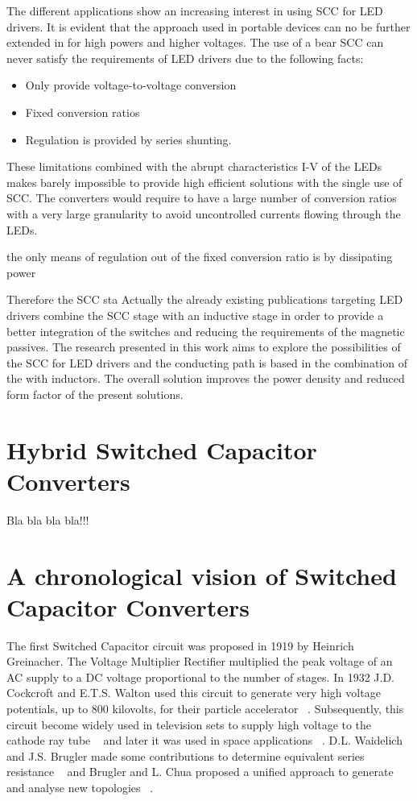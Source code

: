 The different applications show an increasing interest in using SCC for LED drivers. It is evident that the approach used in portable devices can no be further extended in for high powers and higher voltages. The use of a bear SCC can never satisfy the requirements of LED drivers due to the following facts:
\begin{itemize}
  \item Only provide voltage-to-voltage conversion
  \item Fixed conversion ratios
  \item Regulation is provided by series shunting.
\end{itemize}
These limitations combined with the abrupt characteristics I-V of the LEDs makes barely impossible to provide high efficient solutions with the single use of SCC. The converters would require to have a large number of conversion ratios with a very large granularity to avoid uncontrolled currents flowing through the LEDs.



the only means of regulation out of the fixed conversion ratio is by dissipating power


Therefore the SCC sta Actually the already existing publications targeting LED drivers combine the SCC stage with an inductive stage in order to provide a better integration of the switches and reducing the requirements of the magnetic passives. The research presented in this work aims to explore the possibilities of the SCC for LED drivers and the conducting path is based in the combination of the with inductors. The overall solution improves the power density and reduced form factor of the present solutions.


\section[H-SCC]{Hybrid Switched Capacitor Converters}

Bla bla bla bla!!!



\section[Chronological Vision of SCC]{A chronological vision of Switched Capacitor Converters}


The first Switched Capacitor circuit was proposed in 1919 by Heinrich Greinacher. The Voltage Multiplier Rectifier
multiplied the peak voltage of an AC supply to a DC voltage proportional to the number of stages.
In 1932 J.D. Cockcroft and E.T.S. Walton used this circuit to generate very high voltage potentials,
up to 800 kilovolts, for their particle accelerator ~\cite{30Cock}. Subsequently, this circuit become widely used in
television sets to supply high voltage to the cathode ray tube ~\cite{70Buechel} and later it was used in space applications
~\cite{86Weinberg}. D.L. Waidelich and J.S. Brugler made some contributions to determine equivalent series resistance
~\cite{44Waidelich,71Brugler} and Brugler and L. Chua proposed a unified approach to generate and analyse new topologies
~\cite{71Brugler,77Lin}.


